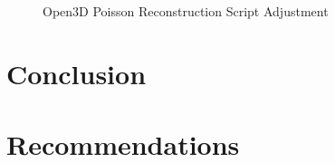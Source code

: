 \documentclass[12pt]{report}
\begin{document}
\begin{figure}[H]
\caption{Open3D Poisson Reconstruction Script Adjustment}
\label{fig:open3dpossionscreipt_result} 
\end{figure}

\chapter{Conclusion}

\chapter{Recommendations}

\nocite{*}   %



\appendix
\end{document}
